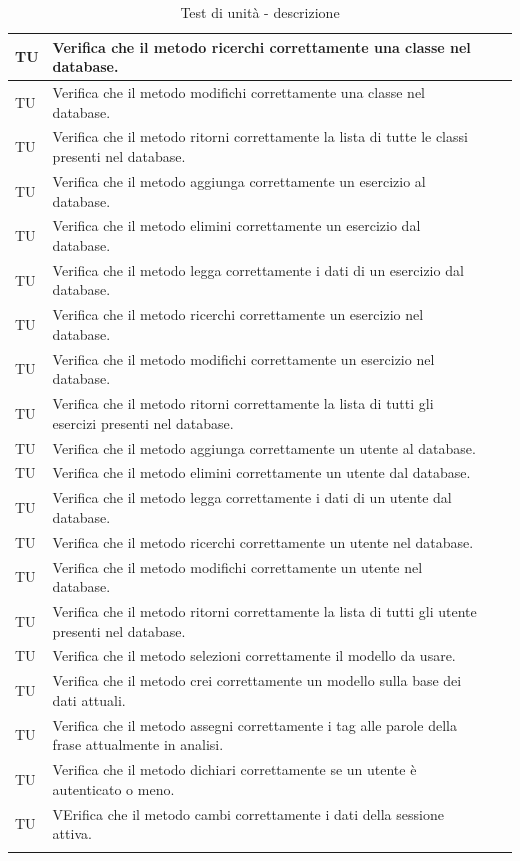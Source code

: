 \begin{longtable}{|>{\centering\arraybackslash}m{1.6cm}|>{\centering\arraybackslash}m{6.41cm}|>{\centering\arraybackslash}m{3.1cm}| c |}
		TU & Verifica che il metodo ricerchi correttamente una classe nel database. \\ \hline
		TU & Verifica che il metodo modifichi correttamente una classe nel database. \\ \hline
		TU & Verifica che il metodo ritorni correttamente la lista di tutte le classi presenti nel database.  \\ \hline	
		TU & Verifica che il metodo aggiunga correttamente un esercizio al database. \\ \hline
		TU & Verifica che il metodo elimini correttamente un esercizio dal database. \\ \hline
		TU & Verifica che il metodo legga correttamente i dati di un esercizio dal database. \\ \hline
		TU & Verifica che il metodo ricerchi correttamente un esercizio nel database. \\ \hline
		TU & Verifica che il metodo modifichi correttamente un esercizio nel database. \\ \hline
		TU & Verifica che il metodo ritorni correttamente la lista di tutti gli esercizi presenti nel database.  \\ \hline	
		TU & Verifica che il metodo aggiunga correttamente un utente al database. \\ \hline
		TU & Verifica che il metodo elimini correttamente un utente dal database. \\ \hline
		TU & Verifica che il metodo legga correttamente i dati di un utente dal database. \\ \hline
		TU & Verifica che il metodo ricerchi correttamente un utente nel database. \\ \hline
		TU & Verifica che il metodo modifichi correttamente un utente nel database. \\ \hline
		TU & Verifica che il metodo ritorni correttamente la lista di tutti gli utente presenti nel database.  \\ \hline
		TU & Verifica che il metodo selezioni correttamente il modello da usare.  \\ \hline
		TU & Verifica che il metodo crei correttamente un modello sulla base dei dati attuali.  \\ \hline
		TU & Verifica che il metodo assegni correttamente i tag alle parole della frase attualmente in analisi.  \\ \hline
		TU & Verifica che il metodo dichiari correttamente se un utente è autenticato o meno.  \\ \hline
		TU & VErifica che il metodo cambi correttamente i dati della sessione attiva.  \\ \hline
		\caption{Test di unità - descrizione}
\end{longtable}


